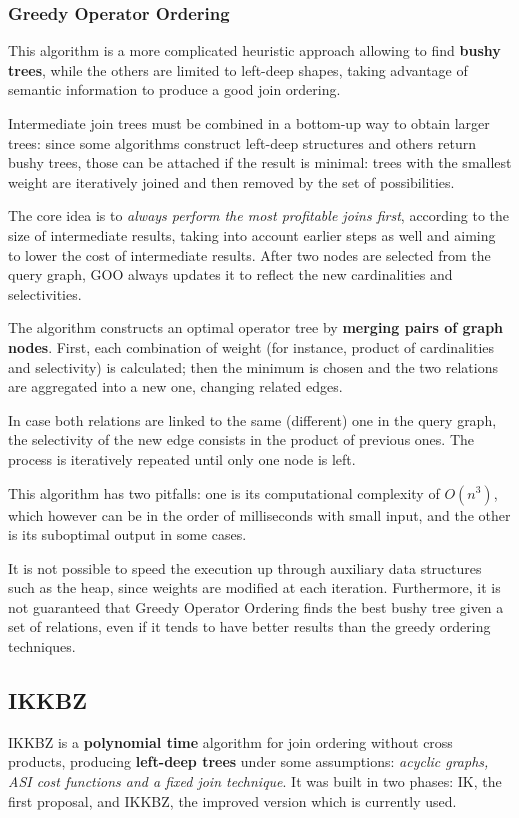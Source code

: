 \subsubsection{Greedy Operator Ordering}
This algorithm is a more complicated heuristic approach allowing to find \textbf{bushy trees}, while the others are limited to left-deep shapes, taking advantage of semantic information to produce a good join ordering.

Intermediate join trees must be combined in a bottom-up way to obtain larger trees: since some algorithms construct left-deep structures and others return bushy trees, those can be attached if the result is minimal: trees with the smallest weight are iteratively joined and then removed by the set of possibilities. 

The core idea is to \textit{always perform the most profitable joins first}, according to the size of intermediate results, taking into account earlier steps as well and aiming to lower the cost of intermediate results. After two nodes are selected from the query graph, GOO always updates it to reflect the new cardinalities and selectivities.

The algorithm constructs an optimal operator tree by \textbf{merging pairs of graph nodes}. First, each combination of weight (for instance, product of cardinalities and selectivity) is calculated; then the minimum is chosen and the two relations are aggregated into a new one, changing related edges. 

In case both relations are linked to the same (different) one in the query graph, the selectivity of the new edge consists in the product of previous ones. The process is iteratively repeated until only one node is left. 

This algorithm has two pitfalls: one is its computational complexity of $O(n^3)$, which however can be in the order of milliseconds with small input, and the other is its suboptimal output in some cases.

It is not possible to speed the execution up through auxiliary data structures such as the heap, since weights are modified at each iteration. Furthermore, it is not guaranteed that Greedy Operator Ordering finds the best bushy tree given a set of relations, even if it tends to have better results than the greedy ordering techniques.

\subsection{IKKBZ}
IKKBZ is a \textbf{polynomial time} algorithm for join ordering without cross products, producing \textbf{left-deep trees} under some assumptions: \textit{acyclic graphs, ASI cost functions and a fixed join technique}. It was built in two phases: IK, the first proposal, and IKKBZ, the improved version which is currently used.

